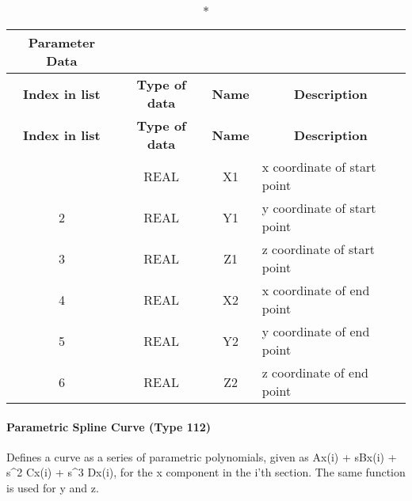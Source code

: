 \begin{longtable}[H]{|c|c|c|l|}
  \caption*{Parameter Data} \\

  \hline
  \multicolumn{1}{|c|}{\textbf{Index in list}} & \multicolumn{1}{|c|}{\textbf{Type of data}} &
  \multicolumn{1}{|c|}{\textbf{Name}} & \multicolumn{1}{|c|}{\textbf{Description}} \\ \hline
  \endfirsthead
  \hline
  \multicolumn{1}{|c|}{\textbf{Index in list}} & \multicolumn{1}{|c|}{\textbf{Type of data}} &
  \multicolumn{1}{|c|}{\textbf{Name}} & \multicolumn{1}{|c|}{\textbf{Description}} \\ \hline
  \endhead
  
  \endfoot

  \endlastfoot
1 & REAL & X1 & x coordinate of start point\\ \hline
2 & REAL & Y1 & y coordinate of start point\\ \hline
3 & REAL & Z1 & z coordinate of start point\\ \hline
4 & REAL & X2 & x coordinate of end point\\ \hline
5 & REAL & Y2 & y coordinate of end point\\ \hline
6 & REAL & Z2 & z coordinate of end point\\ \hline
\end{longtable}


\paragraph{Parametric Spline Curve (Type
112)}\label{parametric-spline-curve-type-112}

Defines a curve as a series of parametric polynomials, given as Ax(i) +
sBx(i) + s\^{}2 Cx(i) + s\^{}3 Dx(i), for the x component in the i'th
section. The same function is used for y and z.

